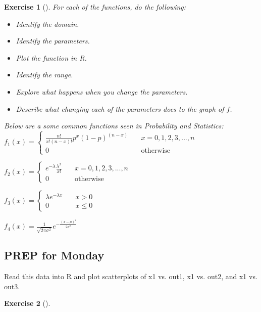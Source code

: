 \documentclass{article}
\theoremstyle{plain}
\theoremstyle{box}
\newtheorem*{exercise*}{Exercise}
\begin{document}
\begin{exercise*}[]
For each of the functions, do the following:
\begin{itemize}
\item Identify the domain.
\item Identify the parameters.
\item Plot the function in R.
\item Identify the range.
\item Explore what happens when you change the parameters.
\item Describe what changing each of the parameters does to the graph of $f$.
\end{itemize}
\vfill

Below are a some common functions seen in Probability and Statistics:\\

$\displaystyle{
f_1(x) = \left\{
        \begin{array}{ll}
            \frac{n!}{x!(n-x)!}p^x(1-p)^{(n-x)} & \quad x = 0, 1, 2, 3, ... , n \\
            0 & \quad \text{otherwise}
        \end{array}
    \right.}$\\
\vfill

$\displaystyle{
f_2(x) = \left\{
        \begin{array}{ll}
            e^{-\lambda}\frac{\lambda^x}{x!} & \quad x = 0, 1, 2, 3, ... , n \\
            0 & \quad \text{otherwise}
        \end{array}
    \right.}$
\vfill


$\displaystyle{
f_3(x) = \left\{
        \begin{array}{ll}
            \lambda e^{-\lambda x} & \quad x > 0 \\
            0 & \quad x \leq 0
        \end{array}
    \right.}$
\vfill

$\displaystyle{
f_4(x) = \frac{1}{\sqrt{2\pi\sigma^2}}e^{-\frac{(x-\mu)^2}{2\sigma^2}}}$
\end{exercise*}



\newpage
\subsection{PREP for Monday}
Read this data into R and plot scatterplots of x1 vs. out1, x1 vs. out2, and x1 vs. out3.
\begin{exercise*}[]
\end{exercise*}



 
\end{document}
